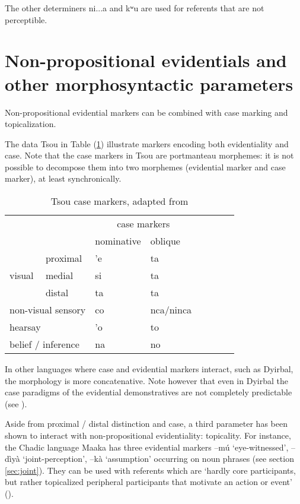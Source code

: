 \documentclass[oneside,a4paper,11pt]{article}
\newcommand{\ipa}[1]{{\phon \mbox{#1}}} %
\begin{document}
The other determiners \ipa{ni...a} and \ipa{kʷu} are used for referents that are not perceptible.

 \section{Non-propositional evidentials and other morphosyntactic parameters} \label{sec:parameter}
Non-propositional evidential markers  can be combined with    case marking and topicalization.

The data Tsou in Table (\ref{tab:tsou})   illustrate markers encoding both evidentiality and case. Note that the case markers in Tsou are portmanteau morphemes: it is not possible to decompose them into two morphemes (evidential marker and case marker), at least synchronically.  
 
\begin{table}[H]
 \caption{Tsou case markers, adapted from \citet[54]{yang00tsou.case}} \centering \label{tab:tsou}
\begin{tabular}{llllllll}
\toprule
	 & 	 & 	\multicolumn{2}{c}{case markers } 	 \\	
	 & 	 & 	nominative & 	oblique \\	
\midrule
	 & 	proximal & 	\ipa{'e} & 	\ipa{ta} \\ 	
visual	 & 	medial & 	\ipa{si} & 	\ipa{ta}  \\ 	
	 & 	distal & 	\ipa{ta} & 	\ipa{ta}  \\ 	
\multicolumn{2}{l}{non-visual sensory}  	 & 	\ipa{co} & 	\ipa{nca/ninca} \\ 	
	 \midrule
\multicolumn{2}{l}{hearsay}	 & 	\ipa{'o} & 	\ipa{to} \\ 	
\multicolumn{2}{l}{belief / inference} 	 & 	\ipa{na} & 	\ipa{no} \\ 	
\bottomrule
\end{tabular}
\end{table} 

In other languages where case and evidential markers interact, such as Dyirbal, the morphology is more concatenative. Note however that even in Dyirbal the case paradigms of the evidential demonstratives are not completely predictable (see \citealt{dixon14nonvisible}).

Aside from proximal / distal distinction and case, a third parameter has been shown to interact with non-propositional evidentiality: topicality. For instance,  the Chadic language Maaka has three evidential markers \ipa{--mú} `eye-witnessed', \ipa{--dìyà} `joint-perception', \ipa{--kà} `assumption' occurring on noun phrases (see section \ref{sec:joint}). They can be used with referents which are `hardly core participants, but rather topicalized peripheral participants that motivate an action or event' (\citealt[195-7]{storch14maaka}).
\end{document}

